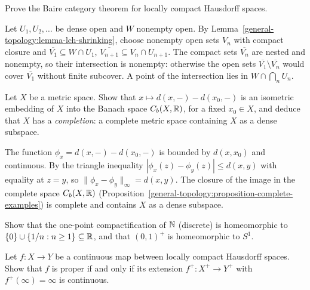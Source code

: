 \begin{exercise}\label{general-topology:exercise-baire-lch}
Prove the Baire category theorem for locally compact Hausdorff spaces.
\end{exercise}

\begin{solution}
Let $U_1, U_2, \ldots$ be dense open and $W$ nonempty open. By Lemma~\ref{general-topology:lemma-lch-shrinking}, choose nonempty open sets $V_n$ with compact
closure and $\overline{V_1} \subseteq W \cap U_1$, $\overline{V_{n+1}} \subseteq V_n \cap U_{n+1}$. The compact sets $\overline{V_n}$ are nested and nonempty, so their
intersection is nonempty: otherwise the open sets $\overline{V_1} \setminus \overline{V_n}$ would cover $\overline{V_1}$ without finite subcover. A point of
the intersection lies in $W \cap \bigcap_n U_n$.
\end{solution}

\begin{exercise}\label{general-topology:exercise-completion}
Let $X$ be a metric space. Show that $x \mapsto d(x, -) - d(x_0, -)$ is an isometric embedding of $X$ into the Banach space $C_b(X, \mathbb{R})$, for a fixed
$x_0 \in X$, and deduce that $X$ has a \emph{completion}: a complete metric space containing $X$ as a dense subspace.
\end{exercise}

\begin{solution}
The function $\phi_x = d(x, -) - d(x_0, -)$ is bounded by $d(x, x_0)$ and continuous. By the triangle inequality $|\phi_x(z) - \phi_y(z)| \leq d(x, y)$ with
equality at $z = y$, so $\|\phi_x - \phi_y\|_\infty = d(x, y)$. The closure of the image in the complete space $C_b(X, \mathbb{R})$
(Proposition~\ref{general-topology:proposition-complete-examples}) is complete and contains $X$ as a dense subspace.
\end{solution}

\begin{exercise}\label{general-topology:exercise-one-point-naturals}
Show that the one-point compactification of $\mathbb{N}$ (discrete) is homeomorphic to $\{0\} \cup \{1/n : n \geq 1\} \subseteq \mathbb{R}$, and that
$(0, 1)^+$ is homeomorphic to $S^1$.
\end{exercise}

\begin{exercise}\label{general-topology:exercise-proper-extension}
Let $f \colon X \to Y$ be a continuous map between locally compact Hausdorff spaces. Show that $f$ is proper if and only if its extension
$f^+ \colon X^+ \to Y^+$ with $f^+(\infty) = \infty$ is continuous.
\end{exercise}

